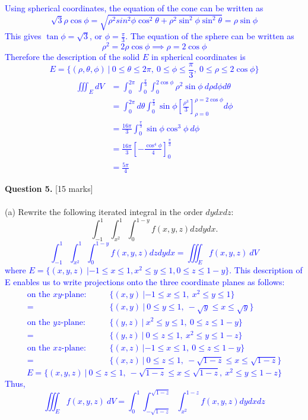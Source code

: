 \documentclass[12pt]{article}
\begin{document}
\textcolor{blue}{
Using spherical coordinates, the equation of the cone can be written as
\[
\sqrt{3}\rho\cos\phi=\sqrt{\rho^2sin^2\phi\cos^2\theta+\rho^2\sin^2\phi\sin^2\theta}=\rho\sin\phi
\]
This gives $\tan\phi=\sqrt{3}$, or $\phi=\frac{\pi}{3}$. The equation of the sphere can be written as
\[
\rho^2=2\rho\cos\phi\implies\rho=2\cos\phi
\]
Therefore the description of the solid $E$ in spherical coordinates is
\[
E=\{(\rho,\theta,\phi)\ |\ 0\leq\theta\leq 2\pi,\ 0\leq\phi\leq\frac{\pi}{3},\ 0\leq\rho\leq2\cos\phi\}
\]
\begin{align*}
	\iiint_EdV&=\int_{0}^{2\pi}\int_{0}^{\frac{\pi}{3}}\int_{0}^{2\cos\phi}\rho^2\sin\phi\ d\rho d\phi d\theta\\
	&=\int_{0}^{2\pi}d\theta\int_{0}^{\frac{\pi}{3}}\sin\phi\left[\frac{\rho^3}{3}\right]_{\rho=0}^{\rho=2\cos\phi}d\phi\\
	&=\frac{16\pi}{3}\int_{0}^{\frac{\pi}{3}}\sin\phi\cos^3\phi\ d\phi\\
	&=\frac{16\pi}{3}\left[-\frac{\cos^4\phi}{4}\right]_{0}^{\frac{\pi}{3}}\\
	&=\frac{5\pi}{4}
\end{align*}
}


{\bf Question 5.} [15 marks]\\
\\\indent
(a) Rewrite the following iterated integral in the order $dydxdz$:
\[
\int_{-1}^{1}\int_{x^2}^{1}\int_{0}^{1-y}f(x,y,z)dzdydx.
\]
\textcolor{blue}{
\[
\int_{-1}^{1}\int_{x^2}^{1}\int_{0}^{1-y}f(x,y,z)dzdydx=\iiint_E f(x,y,z)\ dV
\]
where $E=\{(x,y,z)\ |-1\leq x\leq1,x^2\leq y\leq 1,0\leq z\leq 1-y\}$. This description of E enables us to write projections onto the three coordinate planes as follows: \begin{align*}
	\text{on the }xy\text{-plane:}\qquad &\{(x,y)\ |-1\leq x\leq1,\ x^2\leq y\leq1\}\\
	=&\{(x,y)\ |\ 0\leq y\leq1,\ -\sqrt{y}\leq x\leq\sqrt{y}\}\\
	\text{on the }yz\text{-plane:}\qquad &\{(y,z)\ |\ x^2\leq y\leq1,\ 0\leq z\leq1-y\}\\
	=&\{(y,z)\ |\ 0\leq z\leq1,\ x^2\leq y\leq1-z\}\\
	\text{on the }xz\text{-plane:}\qquad &\{(x,z)\ |-1\leq x\leq1,\ 0\leq z\leq1-y\}\\
	=&\{(x,z)\ |\ 0\leq z\leq1,\ -\sqrt{1-z}\leq x\leq\sqrt{1-z}\}
\end{align*}
\[
E=\{(x,y,z)\ |\ 0\leq z\leq1,\ -\sqrt{1-z}\leq x\leq\sqrt{1-z},\ x^2\leq y\leq1-z\}
\]
Thus,
\[
\iiint_E f(x,y,z)\ dV=\int_0^1\int_{-\sqrt{1-z}}^{\sqrt{1-z}}\int_{x^2}^{1-z}f(x,y,z)dydxdz
\]\\}
\end{document}
